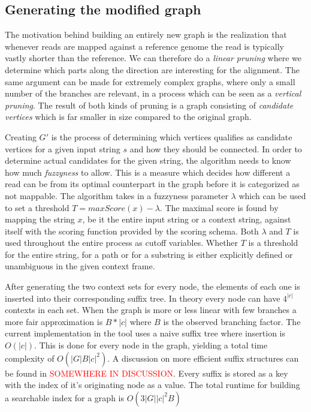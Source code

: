 \documentclass{article}
\begin{document}
\subsection{Generating the modified graph}
The motivation behind building an entirely new graph is the realization that whenever reads are mapped against a reference genome the read is typically vastly shorter than the reference. We can therefore do a \textit{linear pruning} where we determine which parts along the direction are interesting for the alignment. The same argument can be made for extremely complex graphs, where only a small number of the branches are relevant, in a process which can be seen as a \textit{vertical pruning}. The result of both kinds of pruning is a graph consisting of \textit{candidate vertices} which is far smaller in size compared to the original graph.\\
\par\noindent
Creating $G'$ is the process of determining which vertices qualifies as candidate vertices for a given input string $s$ and how they should be connected. In order to determine actual candidates for the given string, the algorithm needs to know how much \textit{fuzzyness} to allow. This is a measure which decides how different a read can be from its optimal counterpart in the graph before it is categorized as not mappable. The algorithm takes in a fuzzyness parameter $\lambda$ which can be used to set a threshold $T=maxScore(x)-\lambda$. The maximal score is found by mapping the string $x$, be it the entire input string or a context string, against itself with the scoring function provided by the scoring schema. Both $\lambda$ and $T$ is used throughout the entire process as cutoff variables. Whether $T$ is a threshold for the entire string, for a path or for a substring is either explicitly defined or unambiguous in the given context frame.\\
\par\noindent
After generating the two context sets for every node, the elements of each one is inserted into their corresponding suffix tree. In theory every node can have $4^{|c|}$ contexts in each set. When the graph is more or less linear with few branches a more fair approximation is $B*|c|$ where $B$ is the observed branching factor. The current implementation in the tool uses a naive suffix tree where insertion is $O(|c|)$. This is done for every node in the graph, yielding a total time complexity of $O(|G|B|c|^2)$. A discussion on more efficient suffix structures can be found in \textcolor{red}{SOMEWHERE IN DISCUSSION}. Every suffix is stored as a key with the index of it's originating node as a value. The total runtime for building a searchable index for a graph is $O(3|G||c|^2B)$
\end{document}
